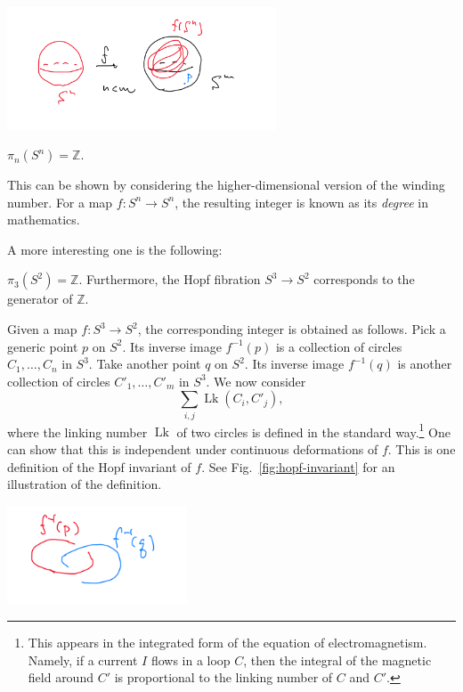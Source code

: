 \documentclass[12pt]{article}
\numberwithin{equation}{section}
\numberwithin{figure}{section}
\theoremstyle{remark}
\renewenvironment{figure}[1][]{
  \begin{originalfigure}[#1]
    \begin{mdframed}[linecolor=black!0,backgroundcolor=black!1]
}{
    \end{mdframed}
  \end{originalfigure}
}
\def\bZ{\mathbb{Z}}
\def\Lk{\mathop{\mathrm{Lk}}}
\begin{document}
\begin{figure}
  \centering
  \includegraphics[width=0.6\textwidth]{nm}
  \caption{A generic map $S^n\to S^m$ with $n<m$ has a point $p\in S^m$ not mapped from $S^n$.}
  \label{fig:nm}
\end{figure}


\begin{theorem}
$\pi_n(S^n) =\bZ$.
\end{theorem}
This can be shown by considering 
the higher-dimensional version of the winding number.
For a map $f:S^n\to S^n$, 
the resulting integer is known as its \emph{degree} in mathematics.

A more interesting one is the following:
\begin{theorem}
  $\pi_3(S^2)=\bZ$. 
  Furthermore, the Hopf fibration $S^3\to S^2$ corresponds 
  to the generator of $\bZ$.
\end{theorem}



Given a map $f:S^3\to S^2$, the corresponding integer is obtained as follows.
Pick a generic point $p$ on $S^2$. 
Its inverse image $f^{-1}(p)$ is a collection of circles $C_1,\ldots, C_n$ in $S^3$.
Take another point $q$ on $S^2$.
Its inverse image $f^{-1}(q)$ is another collection of circles $C'_1,\ldots, C'_m$ in $S^3$.
We now consider \begin{equation}
\sum_{i,j} \Lk(C_i,C'_j), \label{eq:Hopf-invariant-crude}
\end{equation}
where the linking number $\Lk$ of two circles is defined in the standard way.\footnote{This appears in the integrated form of the equation of electromagnetism.
Namely, if a current $I$ flows in a loop $C$,
then the integral of the magnetic field around $C'$ 
is proportional to the linking number of $C$ and $C'$.}
One can show that this is independent under continuous deformations of $f$.
This is one definition of the Hopf invariant of $f$.
See Fig.~\ref{fig:hopf-invariant} for an illustration of the definition.

\begin{figure}
  \centering
  \includegraphics[width=0.4\textwidth]{hopf}
  \caption{A definition of the Hopf invariant of a map $f:S^3\to S^2$  is 
  given by considering the linking number of the inverse images of two points in $S^2$.}
  \label{fig:hopf-invariant}
\end{figure}
\end{document}
